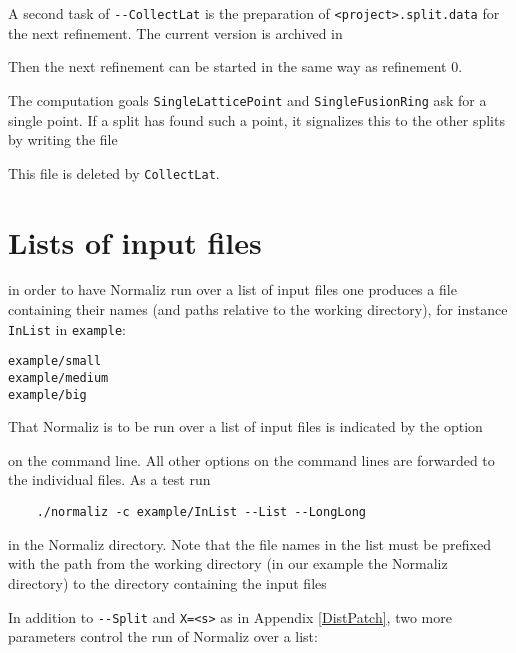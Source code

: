 A second task of \verb*|--CollectLat| is the preparation of \verb*|<project>.split.data| for the next refinement. The current version is archived in
\begin{itemize}
\end{itemize}
Then the next refinement can be started in the same way as refinement $0$.

The computation goals \verb*|SingleLatticePoint| and \verb*|SingleFusionRing| ask for  a single point. If a split has found such a point, it signalizes this to the other splits by writing the file
\begin{itemize}
\end{itemize}
This file is deleted by \verb*|CollectLat|.

\newpage


\section{Lists of input files}\label{input_list}

in order to have Normaliz run over a list of input files one produces a file containing  their names (and paths relative to the working directory), for instance \verb*|InList| in \verb*|example|:
\begin{Verbatim}
example/small
example/medium
example/big
\end{Verbatim}
That Normaliz is to be run over a list of input files is indicated by the option
\begin{itemize}
\end{itemize}
on the command line. All other options on the command lines are forwarded to the individual files. As a test run
\begin{Verbatim}
	./normaliz -c example/InList --List --LongLong
\end{Verbatim}
in the Normaliz directory. Note that the file names in the list must be prefixed with the path from the working directory (in our example the Normaliz directory) to the directory containing the input files 

In addition to \verb*|--Split| and \verb*|X=<s>| as in Appendix \ref{DistPatch}, two more parameters control the run of Normaliz over a list:

